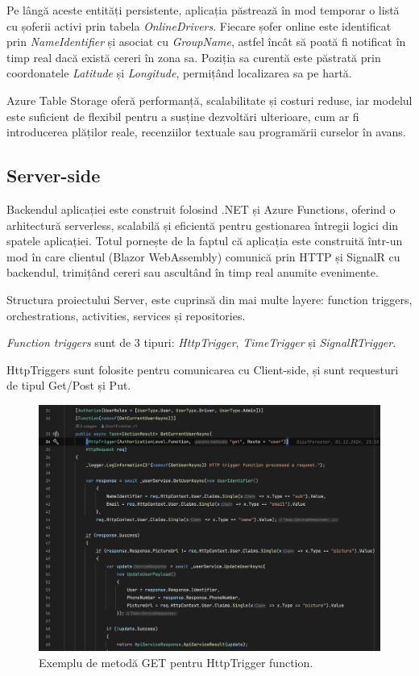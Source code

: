 Pe lângă aceste entități persistente, aplicația păstrează în mod temporar o listă cu șoferii activi prin tabela \textit{OnlineDrivers}.
Fiecare șofer online este identificat prin \textit{NameIdentifier} și asociat cu \textit{GroupName}, astfel încât să poată fi notificat
în timp real dacă există cereri în zona sa. Poziția sa curentă este păstrată prin coordonatele \textit{Latitude} și \textit{Longitude},
permițând localizarea sa pe hartă.

Azure Table Storage oferă performanță, scalabilitate și costuri reduse, iar modelul este suficient
de flexibil pentru a susține dezvoltări ulterioare, cum ar fi introducerea plăților reale, recenziilor textuale
sau programării curselor în avans.

\subsection{Server-side}

Backendul aplicației este construit folosind .NET și Azure Functions, oferind o arhitectură
serverless, scalabilă și eficientă pentru gestionarea întregii logici din spatele aplicației.
Totul pornește de la faptul că aplicația este construită într-un mod în care clientul
(Blazor WebAssembly) comunică prin HTTP și SignalR cu backendul, trimițând cereri sau
ascultând în timp real anumite evenimente.

Structura proiectului Server, este cuprinsă din mai multe layere: function triggers, orchestrations,
activities, services și repositories.

\textit{Function triggers} sunt de 3 tipuri: \textit{HttpTrigger}, \textit{TimeTrigger} și \textit{SignalRTrigger}.

HttpTriggers sunt folosite pentru comunicarea cu Client-side, și sunt requesturi de tipul Get/Post și Put.
\begin{figure}[H]
    \centering
    \includegraphics[width=14cm]{Assets/HttpTrigger.png}
    \caption{Exemplu de metodă GET pentru HttpTrigger function.}
    \label{fig:HttpTrigger}
\end{figure}

